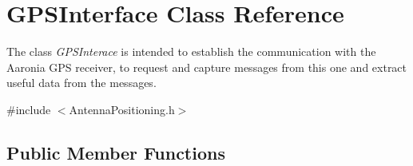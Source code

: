 \hypertarget{classGPSInterface}{}\section{G\+P\+S\+Interface Class Reference}
\label{classGPSInterface}


The class {\itshape G\+P\+S\+Interace} is intended to establish the communication with the Aaronia G\+PS receiver, to request and capture messages from this one and extract useful data from the messages.  




{\ttfamily \#include $<$Antenna\+Positioning.\+h$>$}

\subsection*{Public Member Functions}
